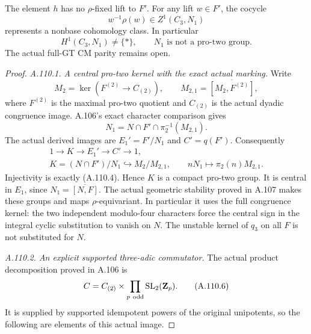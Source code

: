 The element \(h\) has no \(\rho\)-fixed lift to \(F'\). For any
lift \(w\in F'\), the cocycle
\[
 w^{-1}\rho(w)\in Z^1(C_3,N_1)
 \tag{A.110.2}
\]
represents a nonbase cohomology class. In particular
\[
 H^1(C_3,N_1)\ne\{*\},\qquad N_1
       \text{ is not a pro-two group}.
 \tag{A.110.3}
\]
The actual full-GT CM parity remains open.
\begin{proof}
\emph{A.110.1. A central pro-two kernel with the exact actual marking.}
Write
\[
 M_2=\ker(F^{(2)}\to C_{(2)}),\qquad
 M_{2,1}=\overline{[M_2,F^{(2)}]},
\]
where \(F^{(2)}\) is the maximal pro-two quotient and \(C_{(2)}\)
is the actual dyadic congruence image. A.106's exact character
comparison gives
\[
 N_1=N\cap F'\cap\pi_2^{-1}(M_{2,1}).
 \tag{A.110.4}
\]
The actual derived images are
\(E_1'=F'/N_1\) and \(C'=q(F')\). Consequently
\[
 \begin{gathered}
 1\longrightarrow K\longrightarrow E_1'
       \longrightarrow C'\longrightarrow1,\\
 K=(N\cap F')/N_1
       \hookrightarrow M_2/M_{2,1},\qquad
 nN_1\longmapsto\pi_2(n)M_{2,1}.
 \end{gathered}
 \tag{A.110.5}
\]
Injectivity is exactly (A.110.4). Hence \(K\) is a compact pro-two
group. It is central in \(E_1\), since \(N_1=\overline{[N,F]}\).
The actual geometric stability proved in A.107 makes these groups
and maps \(\rho\)-equivariant. In particular it uses the full
congruence kernel: the two independent modulo-four characters
force the central sign in the integral cyclic substitution to
vanish on \(N\). The unstable kernel of \(q_3\) on all \(F\)
is not substituted for \(N\).

\emph{A.110.2. An explicit supported three-adic commutator.}
The actual product decomposition proved in A.106 is
\[
 C=C_{(2)}\times\prod_{p\ {\rm odd}}\mathrm{SL}_2(\mathbf Z_p).
 \tag{A.110.6}
\]
It is supplied by supported idempotent powers of the original
unipotents, so the following are elements of this actual image.


\end{proof}
